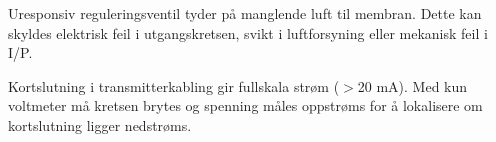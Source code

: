 \vskip 10pt

Uresponsiv reguleringsventil tyder på manglende luft til membran. Dette kan skyldes elektrisk feil i utgangskretsen, svikt i luftforsyning eller mekanisk feil i I/P.

\vskip 10pt

Kortslutning i transmitterkabling gir fullskala strøm ($>$20 mA). Med kun voltmeter må kretsen brytes og spenning måles oppstrøms for å lokalisere om kortslutning ligger nedstrøms.









